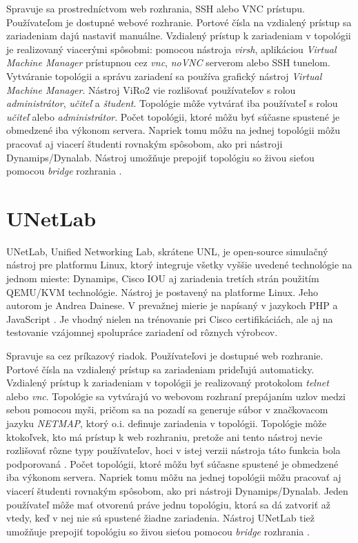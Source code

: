 Spravuje sa prostredníctvom web rozhrania, SSH alebo VNC prístupu. Používateľom je dostupné webové rozhranie. Portové čísla na vzdialený prístup sa zariadeniam dajú nastaviť manuálne. Vzdialený prístup k zariadeniam v topológii je realizovaný viacerými spôsobmi: pomocou nástroja \emph{virsh}, aplikáciou \emph{Virtual Machine Manager} prístupnou cez \emph{vnc}, \emph{noVNC} serverom alebo SSH tunelom. Vytváranie topológii a správu zariadení sa používa grafický nástroj \emph{Virtual Machine Manager}. Nástroj ViRo2 vie rozlišovať používateľov s rolou \emph{administrátor}, \emph{učiteľ} a \emph{študent}. Topológie môže vytvárať iba používateľ s rolou \emph{učiteľ} alebo \emph{administrátor}. Počet topológii, ktoré môžu byť súčasne spustené je obmedzené iba výkonom servera. Napriek tomu môžu na jednej topológii môžu pracovať aj viacerí študenti rovnakým spôsobom, ako pri nástroji Dynamips/Dynalab. Nástroj umožňuje prepojiť topológiu so živou sieťou pomocou \emph{bridge} rozhrania \cite{viro_hadac}.





\section{UNetLab}

UNetLab, Unified Networking Lab, skrátene UNL, je open-source  simulačný nástroj pre platformu Linux, ktorý integruje všetky vyššie uvedené technológie na jednom mieste: Dynamips, Cisco IOU aj zariadenia tretích strán použitím QEMU/KVM technológie. Nástroj je postavený na platforme Linux. Jeho autorom je Andrea Dainese. V prevažnej mierie je napísaný v jazykoch PHP a JavaScript \cite{webiou_unetlab_unetlabv2, unetlab_github}. Je vhodný nielen na trénovanie pri Cisco certifikáciách, ale aj na testovanie vzájomnej spolupráce zariadení od rôznych výrobcov.

Spravuje sa cez príkazový riadok. Používateľovi je dostupné web rozhranie. Portové čísla na vzdialený prístup sa zariadeniam prideľujú automaticky. Vzdialený prístup k zariadeniam v topológii je realizovaný protokolom \emph{telnet} alebo \emph{vnc}. Topológie sa vytvárajú vo webovom rozhraní prepájaním uzlov medzi sebou pomocou myši, pričom sa na pozadí sa generuje súbor v značkovacom jazyku \emph{NETMAP}, ktorý o.i. definuje zariadenia v topológii. Topológie môže ktokoľvek, kto má prístup k web rozhraniu, pretože ani tento nástroj nevie rozlišovať rôzne typy používateľov, hoci v istej verzii nástroja táto funkcia bola podporovaná \cite{unetlab_github}. Počet topológii, ktoré môžu byť súčasne spustené je obmedzené iba výkonom servera. Napriek tomu môžu na jednej topológii môžu pracovať aj viacerí študenti rovnakým spôsobom, ako pri nástroji Dynamips/Dynalab. Jeden používateľ môže mať otvorenú práve jednu topológiu, ktorá sa dá zatvoriť až vtedy, keď v nej nie sú spustené žiadne zariadenia. Nástroj UNetLab tiež umožňuje prepojiť topológiu so živou sieťou pomocou \emph{bridge} rozhrania \cite{webiou_real_network}.

